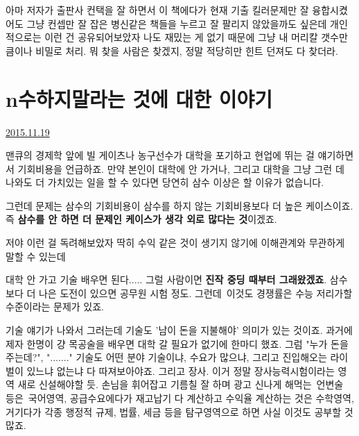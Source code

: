 아마 저자가 출판사 컨택을 잘 하면서 이 책에다가 현재 기출 킬러문제만 잘 융합시켰어도
그냥 컨셉만 잘 잡은 병신같은 책들을 누르고 잘 팔리지 않았을까도 싶은데
개인적으로는 이런 건 공유되어보았자 나도 재밌는 게 없기 때문에 그냥 내 머리칼 갯수만큼이나 비밀로 처리.
뭐 찾을 사람은 찾겠지, 정말 적당히만 힌트 던져도 다 찾더라.
\vspace{5mm}







\section{n수하지말라는 것에 대한 이야기}
\href{https://www.kockoc.com/Apoc/501678}{2015.11.19}

\vspace{5mm}

맨큐의 경제학 앞에 빌 게이츠나 농구선수가
대학을 포기하고 현업에 뛰는 걸 얘기하면서 기회비용을 언급하죠.
만약 본인이 대학에 안 가거나, 그리고 대학을 그냥 그런 데 나와도 더 가치있는 일을 할 수 있다면
당연히 삼수 이상은 할 이유가 없습니다.
\vspace{5mm}

그런데 문제는 삼수의 기회비용이 삼수를 하지 않는 기회비용보다 더 높은 케이스이죠.
즉 \textbf{삼수를 안 하면 더 문제인 케이스가 생각 외로 많다는 것}이겠죠.
\vspace{5mm}

저야 이런 걸 독려해보았자 딱히 수익 같은 것이 생기지 않기에 이해관계와 무관하게 말할 수 있는데
\vspace{5mm}

대학 안 가고 기술 배우면 된다..... 그럴 사람이면 \textbf{진작 중딩 때부터 그래왔겠죠}.
삼수보다 더 나은 도전이 있으면 공무원 시험 정도.
그런데 이것도 경쟁률은 수능 저리가할 수준이라는 문제가 있죠.
\vspace{5mm}

기술 얘기가 나와서 그러는데 기술도 '남이 돈을 지불해야' 의미가 있는 것이죠.
과거에 제자 한명이 걍 목공술을 배우면 대학 갈 필요가 없기에 한마디 했죠. 그럼 "누가 돈을 주는데?", "......."
기술도 어떤 분야 기술이냐, 수요가 많으냐, 그리고 진입해오는 라이벌이 있느냐 없는냐 다 따져보아야죠.
그리고 장사. 이거 정말 장사능력시험이라는 영역 새로 신설해야할 듯.
손님을 휘어잡고 기름칠 잘 하며 광고 신나게 해먹는 언변술 등은 국어영역,
공급수요에다가 재고납기 다 계산하고 수익율 계산하는 것은 수학영역,
거기다가 각종 행정적 규제, 법률, 세금 등을 탐구영역으로 하면 사실 이것도 공부할 것 많죠.
\vspace{5mm}

